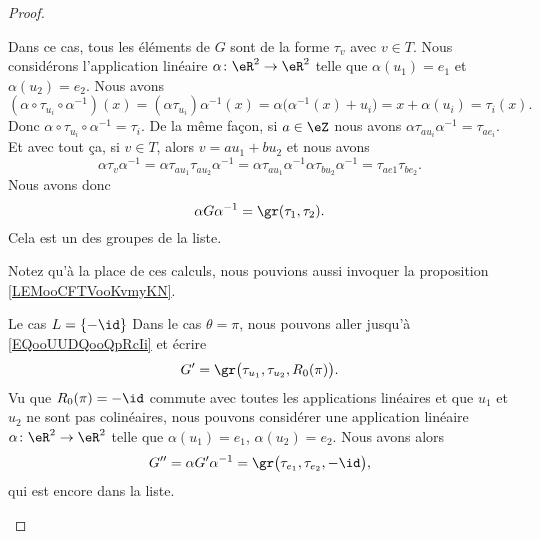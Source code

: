 \begin{proof}
\begin{subproof}
                Dans ce cas, tous les éléments de \( G\) sont de la forme \( \tau_v\) avec \( v\in T\). Nous considérons l'application linéaire \( \alpha\colon \eR^2\to \eR^2\) telle que \( \alpha(u_1)=e_1\) et \( \alpha(u_2)=e_2\). Nous avons
                \begin{equation}
                    (\alpha\circ \tau_{u_i}\circ \alpha^{-1})(x)=(\alpha\tau_{u_i})\alpha^{-1}(x)=\alpha\big( \alpha^{-1}(x)+u_i \big)=x+\alpha(u_i)=\tau_i(x).
                \end{equation}
                Donc \( \alpha\circ \tau_{u_i}\circ \alpha^{-1}=\tau_i\). De la même façon, si \( a\in \eZ\) nous avons \( \alpha\tau_{au_i}\alpha^{-1}=\tau_{ae_i}\). Et avec tout ça, si \( v\in T\), alors \( v=au_1+bu_2\) et nous avons
                \begin{equation}
                    \alpha\tau_v\alpha^{-1}=\alpha\tau_{au_1}\tau_{au_2}\alpha^{-1}=\alpha\tau_{au_1}\alpha^{-1}\alpha\tau_{bu_2}\alpha^{-1}=\tau_{ae1}\tau_{be_2}.
                \end{equation}
                Nous avons donc
                \begin{equation}
                    \alpha G\alpha^{-1}=\gr(\tau_1,\tau_2).
                \end{equation}
                Cela est un des groupes de la liste.
                
                Notez qu'à la place de ces calculs, nous pouvions aussi invoquer la proposition \ref{LEMooCFTVooKvmyKN}.
            \item[Le cas \( L=\{ -\id \}\)]
                Dans le cas \( \theta=\pi\), nous pouvons aller jusqu'à \eqref{EQooUUDQooQpRcIi} et écrire
                \begin{equation}
                    G'=\gr\big( \tau_{u_1}, \tau_{u_2}, R_0(\pi) \big).
                \end{equation}
                Vu que \( R_0(\pi)=-\id\) commute avec toutes les applications linéaires et que \( u_1\) et \( u_2\) ne sont pas colinéaires, nous pouvons considérer une application linéaire \( \alpha\colon \eR^2\to \eR^2\) telle que \( \alpha(u_1)=e_1\), \( \alpha(u_2)=e_2\). Nous avons alors
                \begin{equation}
                    G''=\alpha G'\alpha^{-1}=\gr\big( \tau_{e_1}, \tau_{e_2},-\id \big),
                \end{equation}
                qui est encore dans la liste.
    \end{subproof}
\end{proof}


